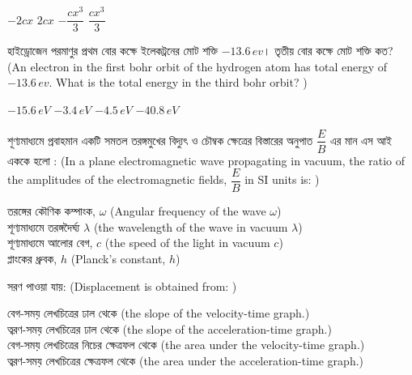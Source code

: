 \documentclass[addpoints]{exam}
\begin{document}
\begin{questions}
\begin{oneparchoices}
\choice $ -2cx $
\choice $ 2cx $
\choice $ -\dfrac{cx^{3}}{3} $
\choice $ \dfrac{cx^{3}}{3} $

\end{oneparchoices}

\question  হাইড্রোজেন পরমাণুর প্রথম বোর কক্ষে ইলেকট্রনের মোট শক্তি $ -13.6\,ev $। তৃতীয় বোর কক্ষে মোট শক্তি কত? (An electron in the first bohr orbit of the hydrogen atom has total energy of $ -13.6\,ev $. What is the total energy in the third bohr orbit? )

\begin{oneparchoices}
\choice $ -15.6\,eV $
\choice $ -3.4\,eV $
\choice $ -4.5\,eV $
\choice $ -40.8\,eV $
\end{oneparchoices}

\question শূণ্যমাধ্যমে প্রবাহমান একটি সমতল তরঙ্গমুখের বিদ্যুৎ ও চৌম্বক ক্ষেত্রের বিস্তারের অনুপাত $ \dfrac{E}{B} $ এর মান এস আই এককে হলো : (In a plane electromagnetic wave propagating in vacuum, the ratio of the amplitudes of the electromagnetic fields, $ \dfrac{E}{B} $ in SI units is: )

\begin{oneparchoices}
\hspace*{.2cm}\choice তরঙ্গের কৌণিক কম্পাংক, $ \omega $ (Angular frequency of the wave $ \omega $)\\
\choice শূণ্যমাধ্যমে তরঙ্গদৈর্ঘ্য $ \lambda $ (the wavelength of the wave in vacuum $ \lambda $)\\
\choice  শূণ্যমাধ্যমে আলোর বেগ, $ c $ (the speed of the light in vacuum $ c $)\\
\choice  প্লাংকের ধ্রুবক, $ h $ (Planck's constant, $ h $)
\end{oneparchoices}

\question  সরণ পাওয়া যায়: (Displacement is obtained from: )

\begin{oneparchoices}
\choice বেগ-সময় লেখচিত্রের ঢাল থেকে (the slope of the velocity-time graph.)\\
\choice ত্বরণ-সময় লেখচিত্রের ঢাল থেকে (the slope of the acceleration-time graph.)\\
\choice বেগ-সময় লেখচিত্রের নিচের ক্ষেত্রফল থেকে (the area under the velocity-time graph.)\\
\choice ত্বরণ-সময় লেখচিত্রের ক্ষেত্রফল থেকে (the area under the acceleration-time graph.)

\end{oneparchoices}


\end{questions}
\end{document}
